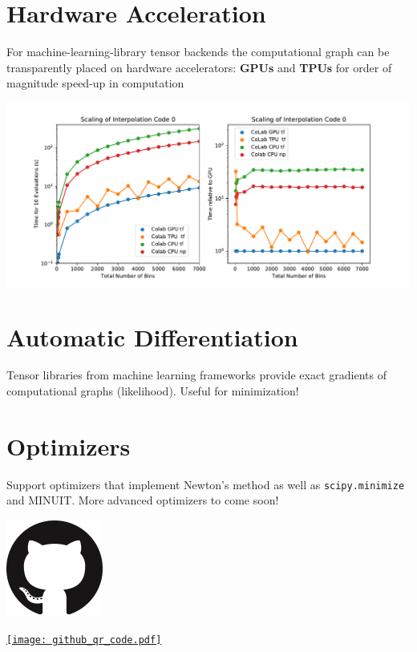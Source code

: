 \documentclass[a0,portrait]{a0poster}
\begin{document}
\begin{multicols}{2}
 \section*{\LARGE\color{MediumBlue} Hardware Acceleration}
 For machine-learning-library tensor backends the computational graph can be transparently placed on hardware accelerators: \textbf{GPUs} and \textbf{TPUs} for order of magnitude speed-up in computation
 \begin{center}
  \includegraphics[width=\linewidth]{scaling_hardware.pdf}
 \end{center}

 \section*{\LARGE\color{MediumBlue} Automatic Differentiation}

 Tensor libraries from machine learning frameworks provide exact gradients of computational graphs (likelihood). Useful for minimization!

 \section*{\LARGE\color{MediumBlue} Optimizers}

 Support optimizers that implement Newton's method as well as \texttt{scipy.minimize} and MINUIT. More advanced optimizers to come soon!

 \vspace{1cm}
 \begin{minipage}{0.5\linewidth}
  \begin{flushright}
   \href{https://github.com/diana-hep/pyhf}{\includegraphics[width=0.3\linewidth]{GitHub_logo.png}}
  \end{flushright}
 \end{minipage}%
 \quad
 \begin{minipage}{0.5\linewidth}
  \begin{flushleft}
   \href{https://github.com/diana-hep/pyhf}{\texttt{[image: github\_qr\_code.pdf]}}
  \end{flushleft}
 \end{minipage}%


\end{multicols}
\end{document}
